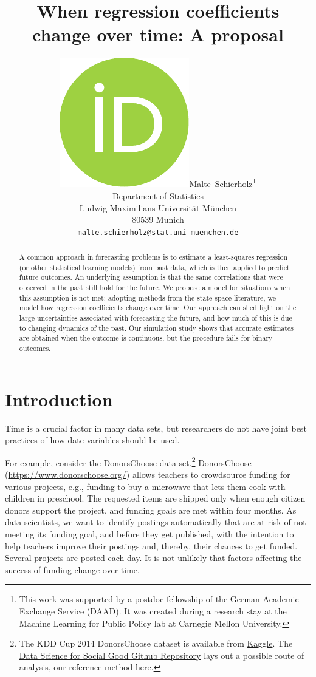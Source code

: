 \documentclass{article}
\title{When regression coefficients change over time: A proposal}
\author{ \href{https://orcid.org/0000-0003-4058-1543}{\includegraphics[scale=0.06]{orcid.pdf}\hspace{1mm}Malte~Schierholz}\thanks{This work was supported by a postdoc fellowship of the German Academic Exchange Service (DAAD). It was created during a research stay at the Machine Learning for Public Policy lab at Carnegie Mellon University.} \\
	Department of Statistics\\
	Ludwig-Maximilians-Universität München\\
	80539 Munich \\
	\texttt{malte.schierholz@stat.uni-muenchen.de} \\
}
\begin{document}
\maketitle

\begin{abstract}
	A common approach in forecasting problems is to estimate a least-squares regression (or other statistical learning models) from past data, which is then applied to predict future outcomes. An underlying assumption is that the same correlations that were observed in the past still hold for the future. We propose a model for situations when this assumption is not met: adopting methods from the state space literature, we model how regression coefficients change over time. Our approach can shed light on the large uncertainties associated with forecasting the future, and how much of this is due to changing dynamics of the past. Our simulation study shows that accurate estimates are obtained when the outcome is continuous, but the procedure fails for binary outcomes.
\end{abstract}




\section{Introduction}\label{sec:introduction}

Time is a crucial factor in many data sets, but researchers do not have joint best practices of how date variables should be used.

For example, consider the DonorsChoose data set.\footnote{The KDD Cup 2014 DonorsChoose dataset is available from \href{https://www.kaggle.com/c/kdd-cup-2014-predicting-excitement-at-donors-choose/data}{Kaggle}. The \href{https://github.com/dssg/donors-choose}{Data Science for Social Good Github Repository} lays out a possible route of analysis, our reference method here.} DonorsChoose (\url{https://www.donorschoose.org/}) allows teachers to crowdsource funding for various projects, e.g., funding to buy a microwave that lets them cook with children in preschool. The requested items are shipped only when enough citizen donors support the project, and funding goals are met within four months. As data scientists, we want to identify postings automatically that are at risk of not meeting its funding goal, and before they get published, with the intention to help teachers improve their postings and, thereby, their chances to get funded. Several projects are posted each day. It is not unlikely that factors affecting the success of funding change over time.
\end{document}
